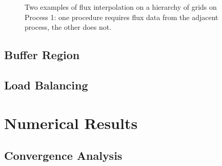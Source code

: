 \documentclass{article}
\begin{document}

    \begin{figure}[H]
        \center
        
       \caption{Two examples of flux interpolation on a hierarchy of grids
        on Process 1: one procedure requires flux data from the adjacent
        process, the other does not.}
    \end{figure}

    \subsection*{Buffer Region}

    \subsection*{Load Balancing}

\section{Numerical Results}

    \subsection*{Convergence Analysis}
\end{document}
